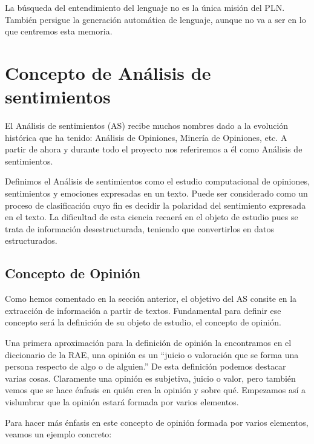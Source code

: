 			



	

	La búsqueda del entendimiento del lenguaje no es la única misión del PLN. También persigue la generación automática de lenguaje, aunque no va a ser en lo que centremos esta memoria.
	
	
	
\section{Concepto de Análisis de sentimientos}\label{conceptoSA}

	El Análisis de sentimientos (AS) recibe muchos nombres dado a la evolución histórica que ha tenido: Análisis de Opiniones, Minería de Opiniones, etc. A partir de ahora y durante todo el proyecto nos referiremos a él como Análisis de sentimientos.
	
	Definimos el Análisis de sentimientos como el estudio computacional de opiniones, sentimientos y emociones expresadas en un texto. Puede ser considerado como un proceso de clasificación cuyo fin es decidir la polaridad del sentimiento expresada en el texto. La dificultad de esta ciencia recaerá en el objeto de estudio pues se trata de información desestructurada, teniendo que convertirlos en datos estructurados. 
	
	\subsection{Concepto de Opinión}\label{opinion}
	
		Como hemos comentado en la sección anterior, el objetivo del AS consite en la extracción de información a partir de textos. Fundamental para definir ese concepto será la definición de su objeto de estudio, el concepto de opinión.
		
		Una primera aproximación para la definición de opinión la encontramos en el diccionario de la RAE, una opinión es un ``juicio o valoración que se forma una persona respecto de algo o de alguien.'' De esta definición podemos destacar varias cosas. Claramente una opinión es subjetiva, juicio o valor, pero también vemos que se hace énfasis en  quién crea la opinión y sobre qué. Empezamos así a vislumbrar que la opinión estará formada por varios elementos. 
		
		Para hacer más énfasis en este concepto de opinión formada por varios elementos, veamos un ejemplo concreto:
		
